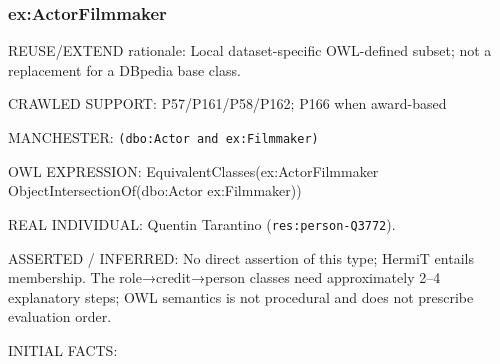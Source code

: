 \documentclass[
  11pt,
]{article}
\begin{document}
\subsubsection{\texorpdfstring{ex:\allowbreak{}\allowbreak{}Actor\allowbreak{}\allowbreak{}Filmmake\allowbreak{}r}{}}\label{exactorfilmmaker}

REUSE/EXTEND rationale: Local dataset-\allowbreak{}specific\allowbreak{}
OWL-defined subset; not a replacement for a DBpedia base class.

CRAWLED SUPPORT:
P57/\allowbreak{}\allowbreak{}P161\allowbreak{}/\allowbreak{}\allowbreak{}P58/\allowbreak{}\allowbreak{}P16\allowbreak{}2;
P166 when award-based

MANCHESTER:
\texttt{(dbo:\allowbreak{}\allowbreak{}Act\allowbreak{}or and e\allowbreak{}x:\allowbreak{}\allowbreak{}Filmma\allowbreak{}ker)}

OWL EXPRESSION:
Equivale\allowbreak{}nt\allowbreak{}Classe\allowbreak{}s(ex:\allowbreak{}\allowbreak{}Act\allowbreak{}or\allowbreak{}Filmma\allowbreak{}ker
Object\allowbreak{}In\allowbreak{}tersecti\allowbreak{}on\allowbreak{}Of(dbo\allowbreak{}:\allowbreak{}\allowbreak{}Actor
ex:\allowbreak{}\allowbreak{}Filmm\allowbreak{}aker))

REAL INDIVIDUAL: Quentin Tarantino
(\texttt{res:\allowbreak{}pers\allowbreak{}on-\allowbreak{}\allowbreak{}Q3772\allowbreak{}}).

ASSERTED / INFERRED: No direct assertion of this type; HermiT entails
membership. The role→credit→person classes need
approxim\allowbreak{}ately 2--4 explanatory steps; OWL semantics is not
procedural and does not prescribe evaluation order.

INITIAL FACTS:
\end{document}
